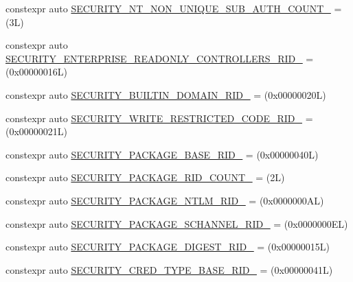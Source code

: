 \begin{DoxyCompactItemize}
\item 
constexpr auto \mbox{\hyperlink{namespaceboost_1_1winapi_a94a4f20cf02ea2ed125c7954f24d0df4}{S\+E\+C\+U\+R\+I\+T\+Y\+\_\+\+N\+T\+\_\+\+N\+O\+N\+\_\+\+U\+N\+I\+Q\+U\+E\+\_\+\+S\+U\+B\+\_\+\+A\+U\+T\+H\+\_\+\+C\+O\+U\+N\+T\+\_\+}} = (3\+L)
\item 
constexpr auto \mbox{\hyperlink{namespaceboost_1_1winapi_a4c0f0a3da972119ba43a9ac2a0bf90f0}{S\+E\+C\+U\+R\+I\+T\+Y\+\_\+\+E\+N\+T\+E\+R\+P\+R\+I\+S\+E\+\_\+\+R\+E\+A\+D\+O\+N\+L\+Y\+\_\+\+C\+O\+N\+T\+R\+O\+L\+L\+E\+R\+S\+\_\+\+R\+I\+D\+\_\+}} = (0x00000016\+L)
\item 
constexpr auto \mbox{\hyperlink{namespaceboost_1_1winapi_a31d0a7a7f60283b72c45c450e746a9db}{S\+E\+C\+U\+R\+I\+T\+Y\+\_\+\+B\+U\+I\+L\+T\+I\+N\+\_\+\+D\+O\+M\+A\+I\+N\+\_\+\+R\+I\+D\+\_\+}} = (0x00000020\+L)
\item 
constexpr auto \mbox{\hyperlink{namespaceboost_1_1winapi_a3c68ad035b4599ad041300dcd629c0ac}{S\+E\+C\+U\+R\+I\+T\+Y\+\_\+\+W\+R\+I\+T\+E\+\_\+\+R\+E\+S\+T\+R\+I\+C\+T\+E\+D\+\_\+\+C\+O\+D\+E\+\_\+\+R\+I\+D\+\_\+}} = (0x00000021\+L)
\item 
constexpr auto \mbox{\hyperlink{namespaceboost_1_1winapi_ae159c3e5487b1aa2fc3be4be1a1c692f}{S\+E\+C\+U\+R\+I\+T\+Y\+\_\+\+P\+A\+C\+K\+A\+G\+E\+\_\+\+B\+A\+S\+E\+\_\+\+R\+I\+D\+\_\+}} = (0x00000040\+L)
\item 
constexpr auto \mbox{\hyperlink{namespaceboost_1_1winapi_abfacf37649fc0aa6282d34435d4bd534}{S\+E\+C\+U\+R\+I\+T\+Y\+\_\+\+P\+A\+C\+K\+A\+G\+E\+\_\+\+R\+I\+D\+\_\+\+C\+O\+U\+N\+T\+\_\+}} = (2\+L)
\item 
constexpr auto \mbox{\hyperlink{namespaceboost_1_1winapi_a45f0bc8de99b0170393484dbde46d3dc}{S\+E\+C\+U\+R\+I\+T\+Y\+\_\+\+P\+A\+C\+K\+A\+G\+E\+\_\+\+N\+T\+L\+M\+\_\+\+R\+I\+D\+\_\+}} = (0x0000000\+A\+L)
\item 
constexpr auto \mbox{\hyperlink{namespaceboost_1_1winapi_aaa08e538df16f3344e83a9e29f7747af}{S\+E\+C\+U\+R\+I\+T\+Y\+\_\+\+P\+A\+C\+K\+A\+G\+E\+\_\+\+S\+C\+H\+A\+N\+N\+E\+L\+\_\+\+R\+I\+D\+\_\+}} = (0x0000000\+E\+L)
\item 
constexpr auto \mbox{\hyperlink{namespaceboost_1_1winapi_a6c16c6f524a78cc5dc1063a7847fd3d5}{S\+E\+C\+U\+R\+I\+T\+Y\+\_\+\+P\+A\+C\+K\+A\+G\+E\+\_\+\+D\+I\+G\+E\+S\+T\+\_\+\+R\+I\+D\+\_\+}} = (0x00000015\+L)
\item 
constexpr auto \mbox{\hyperlink{namespaceboost_1_1winapi_a7e84f8481f36dfd0aefd7bf2bf94c518}{S\+E\+C\+U\+R\+I\+T\+Y\+\_\+\+C\+R\+E\+D\+\_\+\+T\+Y\+P\+E\+\_\+\+B\+A\+S\+E\+\_\+\+R\+I\+D\+\_\+}} = (0x00000041\+L)

\end{DoxyCompactItemize}
